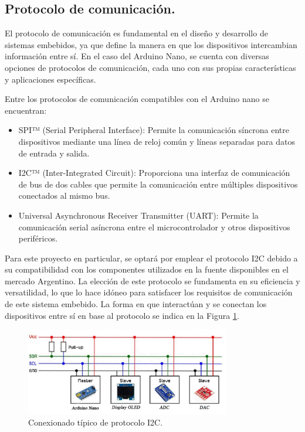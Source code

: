\subsection{Protocolo de comunicación.}
El protocolo de comunicación es fundamental en el diseño y desarrollo de sistemas embebidos, ya que define la manera en que los dispositivos intercambian información entre sí. En el caso del Arduino Nano, se cuenta con diversas opciones de protocolos de comunicación, cada uno con sus propias características y aplicaciones específicas. \par 
Entre los protocolos de comunicación compatibles con el Arduino nano se encuentran:
\begin{itemize}
    \item SPI™ (Serial Peripheral Interface): Permite la comunicación síncrona entre dispositivos mediante una línea de reloj común y líneas separadas para datos de entrada y salida.
    \item I2C™ (Inter-Integrated Circuit): Proporciona una interfaz de comunicación de bus de dos cables que permite la comunicación entre múltiples dispositivos conectados al mismo bus.
    \item Universal Asynchronous Receiver Transmitter (UART): Permite la comunicación serial asíncrona entre el microcontrolador y otros dispositivos periféricos.
\end{itemize}\par 
Para este proyecto en particular, se optará por emplear el protocolo I2C debido a su compatibilidad con los componentes utilizados en la fuente disponibles en el mercado Argentino. La elección de este protocolo se fundamenta en su eficiencia y versatilidad, lo que lo hace idóneo para satisfacer los requisitos de comunicación de este sistema embebido.
La forma en que interactúan y se conectan los dispositivos entre sí en base al protocolo se indica en la Figura \ref{F:diagrama_protocolo_i2c}.

\begin{figure}[H]
    \centering
    \includegraphics[width=0.8\textwidth]{./imagenes/i2cprotocol.jpg}
    \caption{Conexionado típico de protocolo I2C.}
    \label{F:diagrama_protocolo_i2c}
\end{figure}

